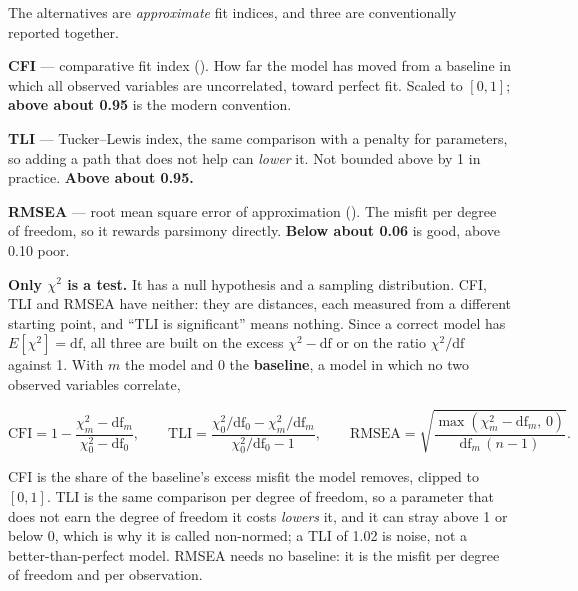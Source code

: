 \documentclass[
  letterpaper,
  10pt,
  twoside,
  openright,
  numbers=noenddot,
  chapterprefix=true]{scrbook}
\begin{document}
The alternatives are \emph{approximate} fit indices, and three are
conventionally reported together.

\begin{qmibdefinition}

{\textbf{CFI}} --- comparative fit index
(). How far the model has moved
from a baseline in which all observed variables are uncorrelated, toward
perfect fit. Scaled to \([0,1]\); \textbf{above about 0.95} is the
modern convention.

\end{qmibdefinition}

\begin{qmibdefinition}

{\textbf{TLI}} --- Tucker--Lewis index, the same comparison with a
penalty for parameters, so adding a path that does not help can
\emph{lower} it. Not bounded above by 1 in practice. \textbf{Above about
0.95.}

\end{qmibdefinition}

\begin{qmibdefinition}

{\textbf{RMSEA}} --- root mean square error of approximation
(). The misfit per
degree of freedom, so it rewards parsimony directly. \textbf{Below about
0.06} is good, above 0.10 poor.

\end{qmibdefinition}

\textbf{Only \(\chi^2\) is a test.} It has a null hypothesis and a
sampling distribution. CFI, TLI and RMSEA have neither: they are
distances, each measured from a different starting point, and ``TLI is
significant'' means nothing. Since a correct model has
\(E[\chi^2] = \mathrm{df}\), all three are built on the excess
\(\chi^2 - \mathrm{df}\) or on the ratio \(\chi^2/\mathrm{df}\) against
1. With \(m\) the model and \(0\) the \textbf{baseline}, a model in
which no two observed variables correlate,

\[
\text{CFI} = 1 - \frac{\chi^2_m - \mathrm{df}_m}{\chi^2_0 - \mathrm{df}_0},
\qquad
\text{TLI} = \frac{\chi^2_0/\mathrm{df}_0 - \chi^2_m/\mathrm{df}_m}{\chi^2_0/\mathrm{df}_0 - 1},
\qquad
\text{RMSEA} = \sqrt{\frac{\max(\chi^2_m - \mathrm{df}_m,\, 0)}{\mathrm{df}_m\,(n-1)}} .
\]

CFI is the share of the baseline's excess misfit the model removes,
clipped to \([0, 1]\). TLI is the same comparison per degree of freedom,
so a parameter that does not earn the degree of freedom it costs
\emph{lowers} it, and it can stray above 1 or below 0, which is why it
is called non-normed; a TLI of 1.02 is noise, not a better-than-perfect
model. RMSEA needs no baseline: it is the misfit per degree of freedom
and per observation.
\end{document}

